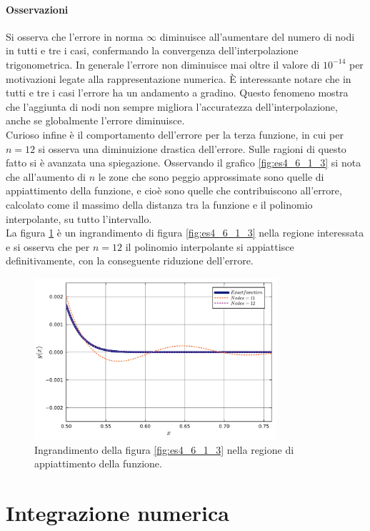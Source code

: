 \documentclass[letterpaper, 12pt]{article}
\begin{document}
\paragraph{Osservazioni}
Si osserva che l'errore in norma $\infty$ diminuisce all'aumentare del numero di nodi in tutti e tre i casi, 
confermando la convergenza dell'interpolazione trigonometrica. In generale l'errore non diminuisce mai oltre
il valore di $10^{-14}$ per motivazioni legate alla rappresentazione numerica. È interessante notare che 
in tutti e tre i casi l'errore ha un andamento a gradino. Questo fenomeno mostra che l'aggiunta di nodi 
non sempre migliora l'accuratezza dell'interpolazione, anche se globalmente l'errore diminuisce. \\
Curioso infine è il comportamento dell'errore per la terza funzione, in cui per $n = 12$ si osserva una
diminuizione drastica dell'errore. Sulle ragioni di questo fatto si è avanzata una spiegazione. 
Osservando il grafico \ref{fig:es4_6_1_3} si nota che all'aumento di $n$ le zone che sono peggio approssimate sono 
quelle di appiattimento della funzione, e cioè sono quelle che contribuiscono all'errore, calcolato 
come il massimo della distanza tra la funzione e il polinomio interpolante, su tutto l'intervallo. \\
La figura \ref{fig:es4_6_1_4} è un ingrandimento di figura \ref{fig:es4_6_1_3} nella regione interessata e 
si osserva che per $n=12$ il polinomio interpolante si appiattisce definitivamente, con la conseguente 
riduzione dell'errore.
\begin{figure}[!ht]
    \centering
    \includegraphics[width=0.8\textwidth]{4617.pdf}
    \caption{Ingrandimento della figura \ref{fig:es4_6_1_3} nella regione di appiattimento della funzione.}
    \label{fig:es4_6_1_4}
\end{figure}

\section{Integrazione numerica}
\end{document}
